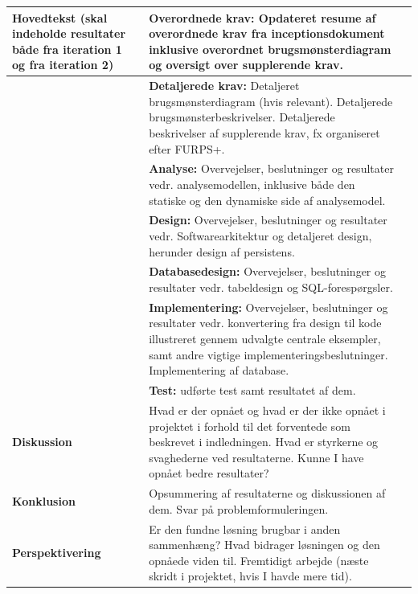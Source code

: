 \begin{longtable}{|p{30mm}|p{90mm}|p{25mm}|}
\textbf{Hovedtekst}
(skal indeholde resultater både fra iteration 1 og fra iteration 2)
    & \textbf{Overordnede krav:}
    Opdateret resume af overordnede krav fra inceptionsdokument inklusive overordnet brugsmønsterdiagram og oversigt over supplerende krav.
                                    &           \\ \hline
    & \textbf{Detaljerede krav:}
    Detaljeret brugsmønsterdiagram (hvis relevant).
    Detaljerede brugsmønsterbeskrivelser.
    Detaljerede beskrivelser af supplerende krav, fx organiseret efter FURPS+.
                                        &           \\ \hline
    & \textbf{Analyse:} 
    Overvejelser, beslutninger og resultater vedr. analysemodellen, inklusive både den statiske og den dynamiske side af analysemodel. 
                                        &           \\ \hline
    & \textbf{Design:}
    Overvejelser, beslutninger og resultater vedr. Softwarearkitektur og detaljeret design, herunder design af persistens. 
                                        &           \\ \hline
    & \textbf{Databasedesign:}
    Overvejelser, beslutninger og resultater vedr. tabeldesign og SQL-forespørgsler.
                                        &           \\ \hline
    & \textbf{Implementering:}
    Overvejelser, beslutninger og resultater vedr.  konvertering fra design til kode illustreret gennem udvalgte centrale eksempler, samt andre vigtige implementeringsbeslutninger. 
    Implementering af database.
                                        &           \\ \hline
    & \textbf{Test:}
    udførte test samt resultatet af dem.
                                        &           \\ \hline

\textbf{Diskussion} & Hvad er der opnået og hvad er der ikke opnået i projektet i forhold til det forventede som beskrevet i indledningen. 
Hvad er styrkerne og svaghederne ved resultaterne.
Kunne I have opnået bedre resultater?
                                        &           \\ \hline

\textbf{Konklusion} & Opsummering af resultaterne og diskussionen af dem. Svar på problemformuleringen. 
                                        &           \\ \hline

\textbf{Perspektivering}   & Er den fundne løsning brugbar i anden sammenhæng?
Hvad bidrager løsningen og den opnåede viden til. 
Fremtidigt arbejde (næste skridt i projektet, hvis I havde mere tid).
                                        &           \\ \hline


\end{longtable}
